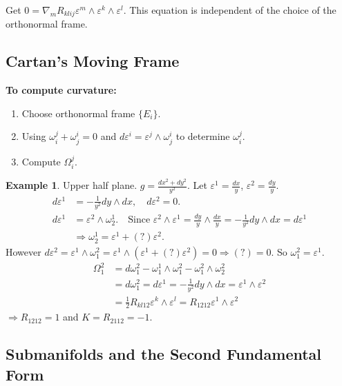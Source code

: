 \documentclass[11pt, a4paper]{article}
\theoremstyle{plain}
\theoremstyle{definition}
\newtheorem{example}[theorem]{Example}
\theoremstyle{remark}
\begin{document}
{Get $0 = \nabla_m R_{klij} \varepsilon^m \wedge \varepsilon^k \wedge \varepsilon^l$. 
This equation is independent of the choice of the orthonormal frame.

\subsection{Cartan's Moving Frame}
\textbf{To compute curvature:}
\begin{enumerate}
    \item Choose orthonormal frame $\{E_i\}$.
    \item Using $\omega_i^j + \omega_j^i = 0$ and $d\varepsilon^i = \varepsilon^j \wedge \omega_j^i$ to determine $\omega_i^j$.
    \item Compute $\Omega_i^j$.
\end{enumerate}

\begin{example}
Upper half plane. $g = \frac{dx^2+dy^2}{y^2}$. Let $\varepsilon^1 = \frac{dx}{y}$, $\varepsilon^2 = \frac{dy}{y}$.
\begin{align*}
d\varepsilon^1 &= -\frac{1}{y^2} dy \wedge dx, \quad d\varepsilon^2 = 0. \\
d\varepsilon^1 &= \varepsilon^2 \wedge \omega_2^1. \quad \text{Since } \varepsilon^2 \wedge \varepsilon^1 = \frac{dy}{y} \wedge \frac{dx}{y} = -\frac{1}{y^2} dy \wedge dx = d\varepsilon^1 \\
&\Rightarrow \omega_2^1 = \varepsilon^1 + (?) \varepsilon^2.
\end{align*}
However $d\varepsilon^2 = \varepsilon^1 \wedge \omega_1^2 = \varepsilon^1 \wedge (\varepsilon^1 + (?) \varepsilon^2) = 0 \Rightarrow (?) = 0$. So $\omega_1^2 = \varepsilon^1$.
\begin{align*}
\Omega_1^2 &= d\omega_1^2 - \omega_1^1 \wedge \omega_1^2 - \omega_1^2 \wedge \omega_2^2 \\
&= d\omega_1^2 = d\varepsilon^1 = -\frac{1}{y^2} dy \wedge dx = \varepsilon^1 \wedge \varepsilon^2 \\
&= \frac{1}{2} R_{kl12} \varepsilon^k \wedge \varepsilon^l = R_{1212} \varepsilon^1 \wedge \varepsilon^2
\end{align*}
$\Rightarrow R_{1212} = 1$ and $K = R_{2112} = -1$.
\end{example}

\subsection{Submanifolds and the Second Fundamental Form}

}
\end{document}
